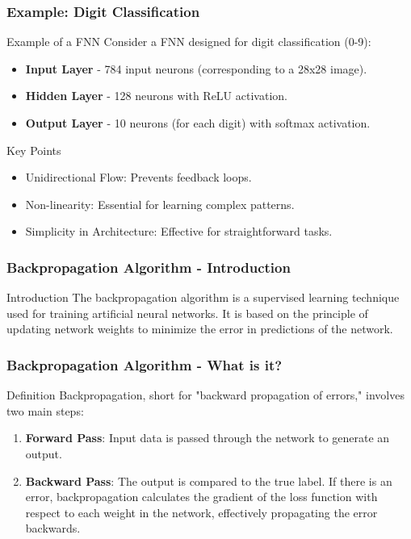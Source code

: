 \documentclass{beamer}
\begin{document}
\begin{frame}[fragile]
    \frametitle{Example: Digit Classification}
    \begin{block}{Example of a FNN}
        Consider a FNN designed for digit classification (0-9):
    \end{block}
    \begin{itemize}
        \item \textbf{Input Layer} - 784 input neurons (corresponding to a 28x28 image).
        \item \textbf{Hidden Layer} - 128 neurons with ReLU activation.
        \item \textbf{Output Layer} - 10 neurons (for each digit) with softmax activation.
    \end{itemize}

    \begin{block}{Key Points}
        \begin{itemize}
            \item Unidirectional Flow: Prevents feedback loops.
            \item Non-linearity: Essential for learning complex patterns.
            \item Simplicity in Architecture: Effective for straightforward tasks.
        \end{itemize}
    \end{block}
\end{frame}

\begin{frame}[fragile]
    \frametitle{Backpropagation Algorithm - Introduction}
    \begin{block}{Introduction}
        The backpropagation algorithm is a supervised learning technique used for training artificial neural networks. 
        It is based on the principle of updating network weights to minimize the error in predictions of the network.
    \end{block}
\end{frame}

\begin{frame}[fragile]
    \frametitle{Backpropagation Algorithm - What is it?}
    \begin{block}{Definition}
        Backpropagation, short for "backward propagation of errors," involves two main steps:
    \end{block}
    \begin{enumerate}
        \item \textbf{Forward Pass}: Input data is passed through the network to generate an output.
        \item \textbf{Backward Pass}: The output is compared to the true label. If there is an error, backpropagation calculates the gradient of the loss function with respect to each weight in the network, effectively propagating the error backwards.
    \end{enumerate}
\end{frame}
\end{document}
